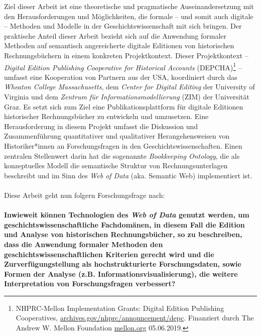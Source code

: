 \documentclass[12pt,a4paper]{article}
\begin{document}
Ziel dieser Arbeit ist eine theoretische und pragmatische Auseinandersetzung mit den Herausforderungen und Möglichkeiten, die formale -- und somit auch digitale -- Methoden und Modelle in der Geschichtswissenschaft mit sich bringen. Der praktische Anteil dieser Arbeit bezieht sich auf die Anwendung formaler Methoden auf semantisch angereicherte digitale Editionen von historischen Rechnungsbüchern in einem konkreten Projektkontext. Dieser Projektkontext -- \textit{Digital Edition Publishing Cooperative for Historical Accounts} (DEPCHA)\footnote{NHPRC-Mellon Implementation Grants: Digital Edition Publishing Cooperatives, \url{archives.gov/nhprc/announcement/depc}. Finanziert durch The Andrew W. Mellon Foundation \url{ mellon.org} 05.06.2019.} -- umfasst eine Kooperation von Partnern aus der USA, koordiniert durch das \textit{Wheaton College Massachusetts}, dem \textit{Center for Digital Editing} der University of Virginia und dem \textit{Zentrum für Informationsmodellierung} (ZIM) der Universität Graz. Es setzt sich zum Ziel eine Publikationsplattform für digitale Editionen historischer Rechnungsbücher zu entwickeln und umzusetzen. Eine Herausforderung in diesem Projekt umfasst die Diskussion und Zusammenführung quantitativer und qualitativer Herangehensweisen von Historiker*innen an Forschungsfragen in den Geschichtswissenschaften. Einen zentralen Stellenwert darin hat die sogenannte \textit{Bookkeeping Ontology}, die als konzeptuelles Modell die semantische Struktur von Rechnungsunterlagen beschreibt und im Sinn des \textit{Web of Data} (aka. Semantic Web) implementiert ist.
\\
\\
Diese Arbeit geht nun folgern Forschungsfrage nach:
\\
\\
\textbf{Inwieweit können Technologien des \textit{Web of Data} genutzt werden, um geschichtswissenschaftliche Fachdomänen, in diesem Fall die Edition und Analyse von historischen Rechnungsbücher, so zu beschreiben, dass die Anwendung formaler Methoden den geschichtswissenschaftlichen Kriterien gerecht wird und die Zurverfügungstellung als hochstrukturierte Forschungsdaten, sowie Formen der Analyse (z.B. Informationsvisualisierung), die weitere Interpretation von Forschungsfragen verbessert?} 
\end{document}
